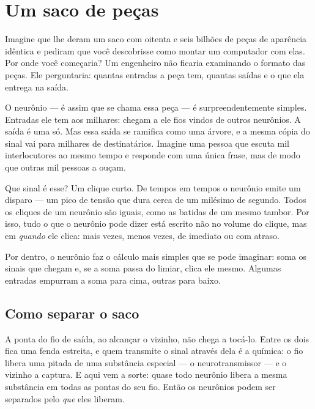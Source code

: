 \chapter{Um saco de peças}


Imagine que lhe deram um saco com oitenta e seis bilhões de peças de aparência idêntica e pediram que você descobrisse como montar um computador com elas. Por onde você começaria? Um engenheiro não ficaria examinando o formato das peças. Ele perguntaria: quantas entradas a peça tem, quantas saídas e o que ela entrega na saída.

O neurônio --- é assim que se chama essa peça --- é surpreendentemente simples. Entradas ele tem aos milhares: chegam a ele fios vindos de outros neurônios. A saída é uma só. Mas essa saída se ramifica como uma árvore, e a mesma cópia do sinal vai para milhares de destinatários. Imagine uma pessoa que escuta mil interlocutores ao mesmo tempo e responde com uma única frase, mas de modo que outras mil pessoas a ouçam.

Que sinal é esse? Um clique curto. De tempos em tempos o neurônio emite um disparo --- um pico de tensão que dura cerca de um milésimo de segundo. Todos os cliques de um neurônio são iguais, como as batidas de um mesmo tambor. Por isso, tudo o que o neurônio pode dizer está escrito não no volume do clique, mas em \emph{quando} ele clica: mais vezes, menos vezes, de imediato ou com atraso.

Por dentro, o neurônio faz o cálculo mais simples que se pode imaginar: soma os sinais que chegam e, se a soma passa do limiar, clica ele mesmo. Algumas entradas empurram a soma para cima, outras para baixo.

\section*{Como separar o saco}

A ponta do fio de saída, ao alcançar o vizinho, não chega a tocá-lo. Entre os dois fica uma fenda estreita, e quem transmite o sinal através dela é a química: o fio libera uma pitada de uma substância especial --- o neurotransmissor --- e o vizinho a captura. E aqui vem a sorte: quase todo neurônio libera a mesma substância em todas as pontas do seu fio. Então os neurônios podem ser separados pelo \emph{que} eles liberam.

